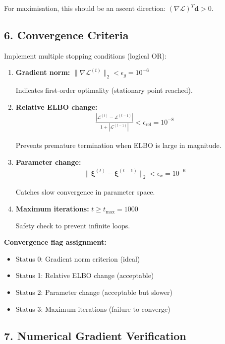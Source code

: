 \documentclass[11pt,a4paper]{article}
\begin{document}
For maximisation, this should be an ascent direction: $(\nabla \mathcal{L})^T \bm{d} > 0$.

\subsection*{6. Convergence Criteria}

Implement multiple stopping conditions (logical OR):

\begin{enumerate}
\item \textbf{Gradient norm:} $\|\nabla \mathcal{L}^{(t)}\|_2 < \epsilon_g = 10^{-6}$

Indicates first-order optimality (stationary point reached).

\item \textbf{Relative ELBO change:}
\begin{align}
\frac{|\mathcal{L}^{(t)} - \mathcal{L}^{(t-1)}|}{1 + |\mathcal{L}^{(t-1)}|} < \epsilon_{\text{rel}} = 10^{-8}
\end{align}

Prevents premature termination when ELBO is large in magnitude.

\item \textbf{Parameter change:}
\begin{align}
\|\bm{\xi}^{(t)} - \bm{\xi}^{(t-1)}\|_2 < \epsilon_x = 10^{-6}
\end{align}

Catches slow convergence in parameter space.

\item \textbf{Maximum iterations:} $t \geq t_{\max} = 1000$

Safety check to prevent infinite loops.
\end{enumerate}

\textbf{Convergence flag assignment:}
\begin{itemize}
\item Status 0: Gradient norm criterion (ideal)
\item Status 1: Relative ELBO change (acceptable)
\item Status 2: Parameter change (acceptable but slower)
\item Status 3: Maximum iterations (failure to converge)
\end{itemize}

\subsection*{7. Numerical Gradient Verification}
\end{document}
